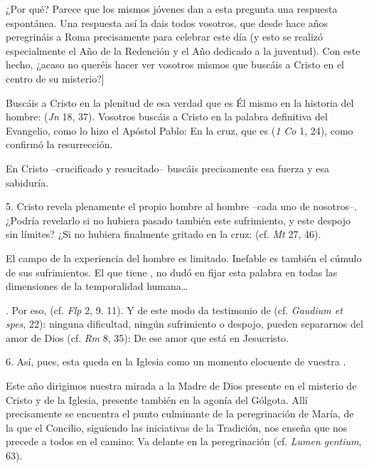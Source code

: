 \begin{body}
{¿Por qué? Parece que los mismos jóvenes dan a esta pregunta una respuesta espontánea. Una respuesta así la dais todos vosotros, que desde hace años peregrináis a Roma precisamente para celebrar este día (y esto se realizó especialmente el Año de la Redención y el Año dedicado a la juventud). Con este hecho, ¿acaso no queréis hacer ver vosotros mismos que buscáis a Cristo en el centro de su misterio?]}

Buscáis a Cristo en la plenitud de esa verdad que es Él mismo en la historia del hombre:  (\textit{Jn} 18, 37). Vosotros buscáis a Cristo en la palabra definitiva del Evangelio, como lo hizo el Apóstol Pablo: En la cruz, que es  (\textit{1 Co} 1, 24), como confirmó la resurrección.

En Cristo –crucificado y resucitado– buscáis precisamente esa fuerza y esa sabiduría.


\newpage

5. Cristo revela plenamente el propio hombre al hombre –cada uno de nosotros–. ¿Podría revelarlo  si no hubiera pasado también este sufrimiento, y este despojo sin límites? ¿Si no hubiera finalmente gritado en la cruz:  (cf. \textit{Mt} 27, 46).

El campo de la experiencia del hombre es limitado. Inefable es también el cúmulo de sus sufrimientos. El que tiene , no dudó en fijar esta palabra en todas las dimensiones de la temporalidad humana\ldots

. Por eso,  (cf. \textit{Flp} 2, 9. 11). Y de este modo da testimonio de  (cf. \textit{Gaudium et spes}, 22): ninguna dificultad, ningún sufrimiento o despojo, pueden separarnos del amor de Dios (cf. \textit{Rm} 8, 35): De ese amor que está en Jesucristo.

6. Así, pues, esta  queda en la Iglesia como un momento elocuente de vuestra .

Este año dirigimos nuestra mirada a la Madre de Dios presente en el misterio de Cristo y de la Iglesia, presente también en la agonía del Gólgota. Allí precisamente se encuentra el punto culminante de la peregrinación de María, de la que el Concilio, siguiendo las iniciativas de la Tradición, nos enseña que nos precede a todos en el camino: Va delante en la peregrinación  (cf. \textit{Lumen gentium}, 63).


\end{body}
